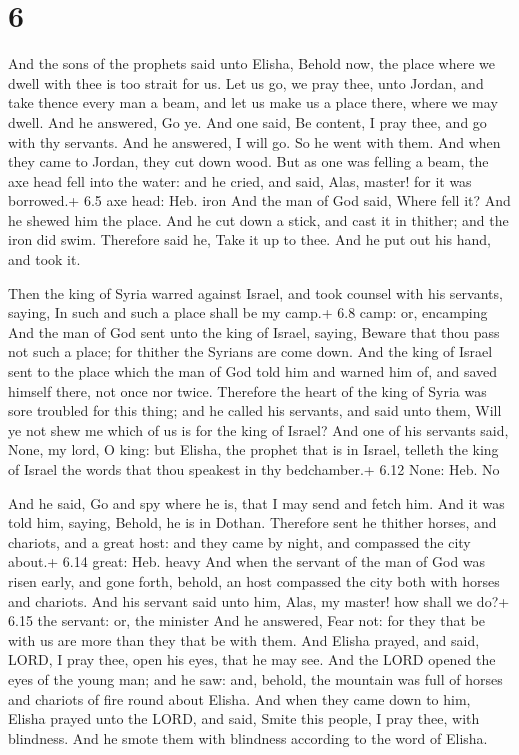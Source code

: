 \hypertarget{section-5}{%
\section{6}\label{section-5}}

 And the sons of the prophets said unto Elisha, Behold now,
the place where we dwell with thee is too strait for us. 
Let us go, we pray thee, unto Jordan, and take thence every man a beam,
and let us make us a place there, where we may dwell. And he answered,
Go ye.  And one said, Be content, I pray thee, and go with
thy servants. And he answered, I will go.  So he went with
them. And when they came to Jordan, they cut down wood.  But
as one was felling a beam, the axe head fell into the water: and he
cried, and said, Alas, master! for it was borrowed.+ 6.5 axe head: Heb.
iron  And the man of God said, Where fell it? And he shewed
him the place. And he cut down a stick, and cast it in thither; and the
iron did swim.  Therefore said he, Take it up to thee. And
he put out his hand, and took it.

 Then the king of Syria warred against Israel, and took
counsel with his servants, saying, In such and such a place shall be my
camp.+ 6.8 camp: or, encamping  And the man of God sent unto
the king of Israel, saying, Beware that thou pass not such a place; for
thither the Syrians are come down.  And the king of Israel
sent to the place which the man of God told him and warned him of, and
saved himself there, not once nor twice.  Therefore the
heart of the king of Syria was sore troubled for this thing; and he
called his servants, and said unto them, Will ye not shew me which of us
is for the king of Israel?  And one of his servants said,
None, my lord, O king: but Elisha, the prophet that is in Israel,
telleth the king of Israel the words that thou speakest in thy
bedchamber.+ 6.12 None: Heb. No

 And he said, Go and spy where he is, that I may send and
fetch him. And it was told him, saying, Behold, he is in Dothan.
 Therefore sent he thither horses, and chariots, and a
great host: and they came by night, and compassed the city about.+ 6.14
great: Heb. heavy  And when the servant of the man of God
was risen early, and gone forth, behold, an host compassed the city both
with horses and chariots. And his servant said unto him, Alas, my
master! how shall we do?+ 6.15 the servant: or, the minister
 And he answered, Fear not: for they that be with us are
more than they that be with them.  And Elisha prayed, and
said, LORD, I pray thee, open his eyes, that he may see. And the LORD
opened the eyes of the young man; and he saw: and, behold, the mountain
was full of horses and chariots of fire round about Elisha.
 And when they came down to him, Elisha prayed unto the
LORD, and said, Smite this people, I pray thee, with blindness. And he
smote them with blindness according to the word of Elisha.

